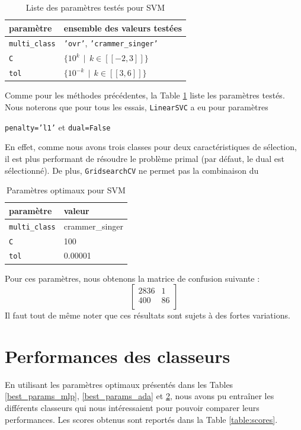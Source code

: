 \documentclass[a4paper]{report}
\begin{document}
\begin{table}[h]
\centering
\begin{tabular}{ll}
paramètre & ensemble des valeurs testées \\
\hline
\texttt{multi\_class} & \texttt{'ovr'}, \texttt{'crammer\_singer'} \\
\texttt{C} & $\{10^k \>\> | \>\> k \in [\![-2, 3]\!] \}$ \\
\texttt{tol} & $\{10^{-k} \>\> | \>\> k \in [\![3, 6]\!] \}$ \\
\end{tabular}
\caption{Liste des paramètres testés pour SVM\label{params_svm}}
\end{table}

Comme pour les méthodes précédentes, la Table \ref{params_svm} liste les paramètres testés. Nous noterons que pour tous les essais, \texttt{LinearSVC} a eu pour paramètres \begin{center}
\texttt{penalty='l1'} et \texttt{dual=False}
\end{center}
En effet, comme nous avons trois classes pour deux caractéristiques de sélection, il est plus performant de résoudre le problème primal (par défaut, le dual est sélectionné). De plus, \texttt{GridsearchCV} ne permet pas la combinaison du %

\begin{table}[h]
\centering
\begin{tabular}{ll}
paramètre & valeur \\
\hline
\texttt{multi\_class} & crammer\_singer \\
\texttt{C} & 100 \\
\texttt{tol} & 0.00001\\
\end{tabular}
\caption{Paramètres optimaux pour SVM\label{best_params_svm}}
\end{table}
Pour ces paramètres, nous obtenons la matrice de confusion suivante :
$$\begin{bmatrix}
2836 & 1 \\ 
400 & 86 \\
\end{bmatrix}$$
Il faut tout de même noter que ces résultats sont sujets à des fortes variations.

\section{Performances des classeurs}

En utilisant les paramètres optimaux présentés dans les Tables \ref{best_params_mlp}, \ref{best_params_ada} et \ref{best_params_svm}, nous avons pu entraîner les différents classeurs qui nous intéressaient pour pouvoir comparer leurs performances. Les scores obtenus sont reportés dans la Table \ref{table:scores}.
\end{document}
